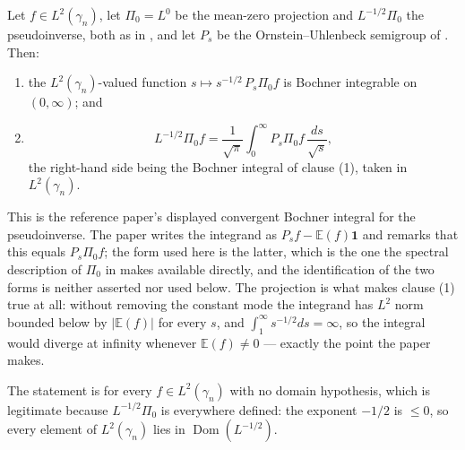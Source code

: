 \begin{lemma}
Let $f \in L^2(\gamma_n)$, let $\Pi_0 = L^0$ be the mean-zero projection and
$L^{-1/2}\Pi_0$ the pseudoinverse, both as in , and let $P_s$ be
the Ornstein--Uhlenbeck semigroup of .  Then:
\begin{enumerate}
\item the $L^2(\gamma_n)$-valued function
$s \mapsto s^{-1/2}\,P_s\Pi_0 f$ is Bochner integrable on $(0,\infty)$; and
\item
\[
  L^{-1/2}\Pi_0 f
    = \frac{1}{\sqrt\pi}\int_0^\infty P_s\Pi_0 f \,\frac{ds}{\sqrt s},
\]
the right-hand side being the Bochner integral of clause (1), taken in
$L^2(\gamma_n)$.
\end{enumerate}

This is the reference paper's displayed convergent Bochner integral for the
pseudoinverse.  The paper writes the integrand as $P_sf - \mathbb{E}(f)\mathbf1$
and remarks that this equals $P_s\Pi_0 f$; the form used here is the latter,
which is the one the spectral description of $\Pi_0$ in  makes
available directly, and the identification of the two forms is neither asserted
nor used below.  The projection is what makes clause (1) true at all: without
removing the constant mode the integrand has $L^2$ norm bounded below by
$|\mathbb{E}(f)|$ for every $s$, and $\int_1^\infty s^{-1/2}ds = \infty$, so the
integral would diverge at infinity whenever $\mathbb{E}(f) \neq 0$ --- exactly
the point the paper makes.

The statement is for every $f \in L^2(\gamma_n)$ with no domain hypothesis, which
is legitimate because $L^{-1/2}\Pi_0$ is everywhere defined: the exponent
$-1/2$ is $\leq 0$, so every element of $L^2(\gamma_n)$ lies in
$\operatorname{Dom}(L^{-1/2})$.
\end{lemma}
